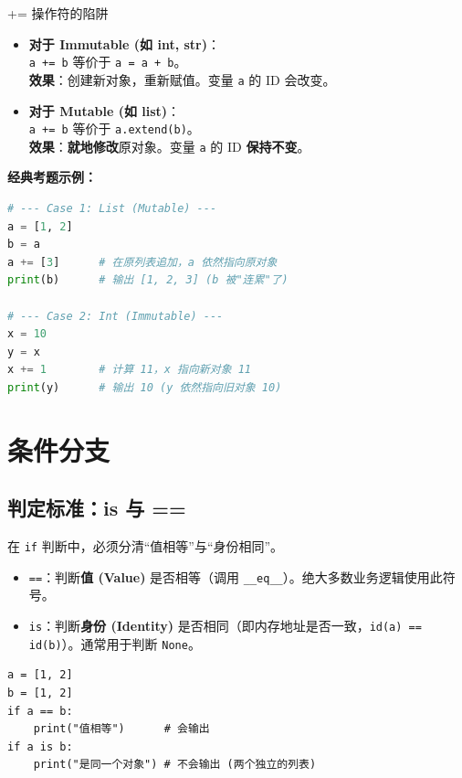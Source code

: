 \documentclass[12pt, a4paper]{article}
\begin{document}
\begin{trapbox}{+= 操作符的陷阱}
\begin{itemize}
    \item \textbf{对于 Immutable (如 int, str)}：\\
    \texttt{a += b} 等价于 \texttt{a = a + b}。\\
    \textbf{效果}：创建新对象，重新赋值。变量 \texttt{a} 的 ID 会改变。
    
    \item \textbf{对于 Mutable (如 list)}：\\
    \texttt{a += b} 等价于 \texttt{a.extend(b)}。\\
    \textbf{效果}：\textbf{就地修改}原对象。变量 \texttt{a} 的 ID \textbf{保持不变}。
\end{itemize}

\textbf{经典考题示例：}
\begin{lstlisting}[language=Python, basicstyle=\ttfamily\small]
# --- Case 1: List (Mutable) ---
a = [1, 2]
b = a
a += [3]      # 在原列表追加，a 依然指向原对象
print(b)      # 输出 [1, 2, 3] (b 被"连累"了)

# --- Case 2: Int (Immutable) ---
x = 10
y = x
x += 1        # 计算 11，x 指向新对象 11
print(y)      # 输出 10 (y 依然指向旧对象 10)
\end{lstlisting}
\end{trapbox}

\section{条件分支}

\subsection{判定标准：is 与 ==}

在 \texttt{if} 判断中，必须分清“值相等”与“身份相同”。

\begin{itemize}
    \item \texttt{==}：判断\textbf{值 (Value)} 是否相等（调用 \texttt{\_\_eq\_\_}）。绝大多数业务逻辑使用此符号。
    \item \texttt{is}：判断\textbf{身份 (Identity)} 是否相同（即内存地址是否一致，\texttt{id(a) == id(b)}）。通常用于判断 \texttt{None}。
\end{itemize}

\newpage

\begin{lstlisting}[caption={is 与 == 的对比}]
a = [1, 2]
b = [1, 2]
if a == b:
    print("值相等")      # 会输出
if a is b:
    print("是同一个对象") # 不会输出 (两个独立的列表)
\end{lstlisting}
\end{document}
